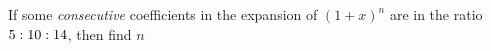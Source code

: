 
%
%
%
%      
% 
% 
%   



\gcalcexpr[0]\tp{\vbone + \vbtwo}
\gcalcexpr[0]\tq{\vbtwo + \vbthree}
\gcalcexpr[2]\tr{\tq / \tp}
\gcalcexpr[0]\ts{(\tr * \vbone + \vbthree) / (\vbtwo - \tr * \vbone)}

\question If some \textit{consecutive} coefficients in the expansion of $(1+x)^n$ are in the 
ratio $5:10:14$, then find $n$

